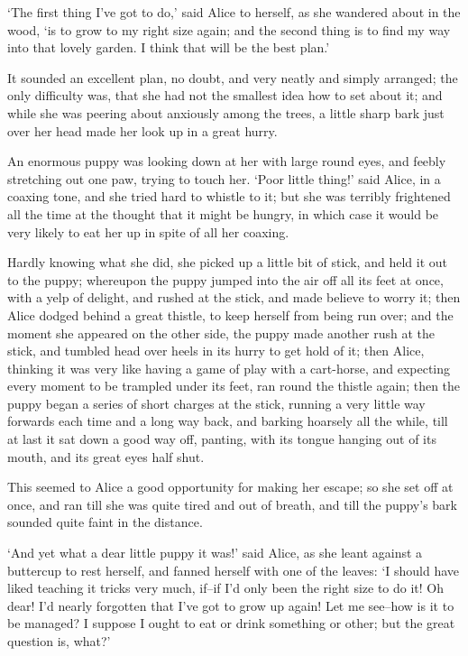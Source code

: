 \documentclass[statementpaper,twoside,openany]{memoir}
\begin{document}
`The first thing I've got to do,' said Alice to herself, as she wandered about in the wood, `is to grow to my right size again; and the second thing is to find my way into that lovely garden. I think that will be the best plan.'

It sounded an excellent plan, no doubt, and very neatly and simply arranged; the only difficulty was, that she had not the smallest idea how to set about it; and while she was peering about anxiously among the trees, a little sharp bark just over her head made her look up in a great hurry.

An enormous puppy was looking down at her with large round eyes, and feebly stretching out one paw, trying to touch her. `Poor little thing!' said Alice, in a coaxing tone, and she tried hard to whistle to it; but she was terribly frightened all the time at the thought that it might be hungry, in which case it would be very likely to eat her up in spite of all her coaxing.

Hardly knowing what she did, she picked up a little bit of stick, and held it out to the puppy; whereupon the puppy jumped into the air off all its feet at once, with a yelp of delight, and rushed at the stick, and made believe to worry it; then Alice dodged behind a great thistle, to keep herself from being run over; and the moment she appeared on the other side, the puppy made another rush at the stick, and tumbled head over heels in its hurry to get hold of it; then Alice, thinking it was very like having a game of play with a cart-horse, and expecting every moment to be trampled under its feet, ran round the thistle again; then the puppy began a series of short charges at the stick, running a very little way forwards each time and a long way back, and barking hoarsely all the while, till at last it sat down a good way off, panting, with its tongue hanging out of its mouth, and its great eyes half shut.

This seemed to Alice a good opportunity for making her escape; so she set off at once, and ran till she was quite tired and out of breath, and till the puppy's bark sounded quite faint in the distance.

`And yet what a dear little puppy it was!' said Alice, as she leant against a buttercup to rest herself, and fanned herself with one of the leaves: `I should have liked teaching it tricks very much, if--if I'd only been the right size to do it! Oh dear! I'd nearly forgotten that I've got to grow up again! Let me see--how is it to be managed? I suppose I ought to eat or drink something or other; but the great question is, what?'
\end{document}
